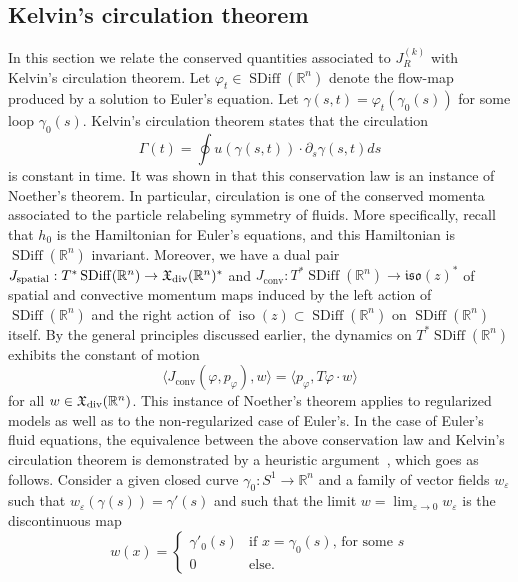 \documentclass[12pt]{amsart}
\newcommand{\dm}[1]{\todo[inline,color=yellow!20]{DM:  #1}}
\newcommand{\R}{\ensuremath{\mathbb{R}}}
\DeclareMathOperator{\SDiff}{SDiff}
\DeclareMathOperator{\iso}{iso}
\begin{document}
  \subsection{Kelvin's circulation theorem}
  \label{sec:Kelvin}
  In this section we relate the conserved quantities associated
  to $J_R^{(k)}$ with Kelvin's circulation theorem.
Let $\varphi_t \in \SDiff(\R^n)$ denote the flow-map
produced by a solution to Euler's equation.
Let $\gamma(s,t) = \varphi_t(\gamma_0(s))$ for some loop $\gamma_0(s)$.
Kelvin's circulation theorem states that the circulation
\begin{equation}\label{eq:Kelvin-circulation}
  \Gamma(t) = \oint u( \gamma(s,t) )  \cdot \partial_s \gamma(s,t) ds
\end{equation}
is constant in time.
It was shown in \cite{Arnold1966} that this conservation law
is an instance of Noether's theorem.
In particular, circulation is one of the conserved momenta
associated to the particle relabeling symmetry of fluids.
More specifically,
recall that $h_0$ is the Hamiltonian for Euler's equations,
and this Hamiltonian is $\SDiff(\R^n)$ invariant. Moreover, we have a dual pair
$J_\text{spatial}: T^*\SDiff(\R^n) \to \mathfrak{X}_{\rm div}(\R^n)^*$
and $J_\text{conv}: T^*\SDiff(\R^n) \to \mathfrak{iso}(z)^*$ of
spatial and convective momentum maps induced by
the left action of $\SDiff(\R^n)$ and the right action of
$\iso(z) \subset \SDiff(\R^n)$ on $\SDiff(\R^n)$ itself.
By the general principles discussed earlier, the dynamics on $T^*\SDiff(\R^n)$ exhibits the constant of motion
\begin{equation}\label{eq:abstract-circulation}
  \langle J_\text{conv}(\varphi,p_\varphi) , w \rangle
  = \langle p_\varphi , T\varphi \cdot w \rangle
\end{equation}
for all $w \in \mathfrak{X}_{\rm div}(\R^n)$.  
This instance of Noether's theorem applies to regularized models as well as to the non-regularized case of Euler's.
In the case of Euler's fluid equations, the equivalence between the above conservation law
and Kelvin's circulation theorem is demonstrated by a heuristic
argument~\cite[Ch~1, Thm~5.5]{ArnoldKhesin1998}, which goes as follows. 
Consider a given closed curve $\gamma_0\colon S^1 \to \R^n$ and a family
of vector fields $w_\varepsilon$ such that $w_\varepsilon(\gamma(s)) = \gamma'(s)$
and such that the limit $w = \lim_{\varepsilon \to 0} w_\varepsilon$ is the discontinuous map
\begin{equation*}
  w(x) = \begin{cases}
    \gamma'_0(s) & \text{if $x = \gamma_0(s)$, for some $s$}\\
    0          & \text{else.}
  \end{cases}
\end{equation*}
\end{document}
